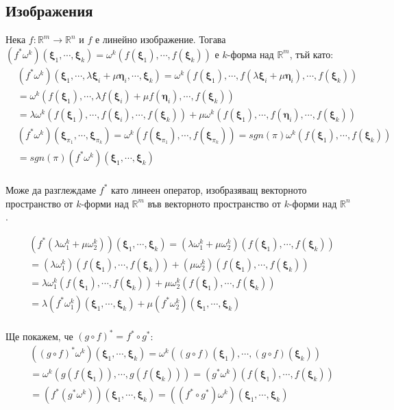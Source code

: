 \documentclass[12pt]{article}
\newcommand\func[3]{#1:#2 \to #3}
\newcommand\myxi[0]{\boldsymbol{\xi}}
\newcommand\myeta[0]{\boldsymbol{\eta}}
\begin{document}
\begin{large}
\subsection{Изображения}
Нека $\func{f}{\mathbb{R}^m}{\mathbb{R}^n}$ и $f$ е линейно изображение. Тогава
$(f^*\omega^k)(\myxi_1,\cdots,\myxi_k)=\omega^k(f(\myxi_1),\cdots,f(\myxi_k))$ е $k$-форма над $\mathbb{R}^m$, тъй като:
\begin{align*}
&(f^* \omega^k)(\myxi_1,\cdots,\lambda\myxi_i+\mu\myeta_i,\cdots,\myxi_k)=\omega^k(f(\myxi_1),\cdots,f(\lambda\myxi_i+\mu\myeta_i),\cdots, f(\myxi_k)) \\
&=\omega^k(f(\myxi_1),\cdots,\lambda f(\myxi_i)+\mu f(\myeta_i),\cdots, f(\myxi_k)) \\
&=\lambda\omega^k(f(\myxi_1),\cdots, f(\myxi_i),\cdots, f(\myxi_k))+\mu\omega^k(f(\myxi_1),\cdots, f(\myeta_i),\cdots, f(\myxi_k))\\
&(f^* \omega^k)(\myxi_{\pi_1},\cdots,\myxi_{\pi_k})=
\omega^k(f(\myxi_{\pi_1}),\cdots,f(\myxi_{\pi_k}))  =sgn(\pi)\omega^k(f(\myxi_1),\cdots,f(\myxi_k))\\
&=sgn(\pi)(f^* \omega^k)(\myxi_1,\cdots,\myxi_k) \\
\end{align*}

Може да разглеждаме $f^*$ като линеен оператор, изобразяващ векторното пространство от $k$-форми над $\mathbb{R}^m$ във векторното пространство от $k$-форми над $\mathbb{R}^n$.

\begin{align*}
&(f^*(\lambda \omega^k_1+\mu\omega^k_2))(\myxi_1,\cdots,\myxi_k)=(\lambda \omega^k_1+\mu\omega^k_2)(f(\myxi_1),\cdots, f(\myxi_k)) \\
&=(\lambda \omega^k_1)(f(\myxi_1),\cdots, f(\myxi_k)) + (\mu\omega^k_2)(f(\myxi_1),\cdots, f(\myxi_k)) \\
&=\lambda \omega^k_1(f(\myxi_1),\cdots, f(\myxi_k)) +\mu\omega^k_2(f(\myxi_1),\cdots, f(\myxi_k)) \\
&=\lambda (f^* \omega^k_1)(\myxi_1,\cdots,\myxi_k)+\mu(f^* \omega^k_2)(\myxi_1,\cdots,\myxi_k)\\
\end{align*}

Ще покажем, че $(g \circ f)^*=f^* \circ g^*$:
\begin{align*}
&((g \circ f)^*\omega^k)(\myxi_1,\cdots,\myxi_k)=\omega^k((g \circ f)(\myxi_1),\cdots, (g \circ f)(\myxi_k)) \\
&=\omega^k(g(f(\myxi_1)),\cdots, g(f(\myxi_k)))=(g^*\omega^k)(f(\myxi_1),\cdots, f(\myxi_k)) \\
&=(f^*(g^*\omega^k))(\myxi_1,\cdots, \myxi_k)= ((f^*\circ g^*)\omega^k)(\myxi_1,\cdots, \myxi_k)\\
\end{align*}


\end{large}
\end{document}
